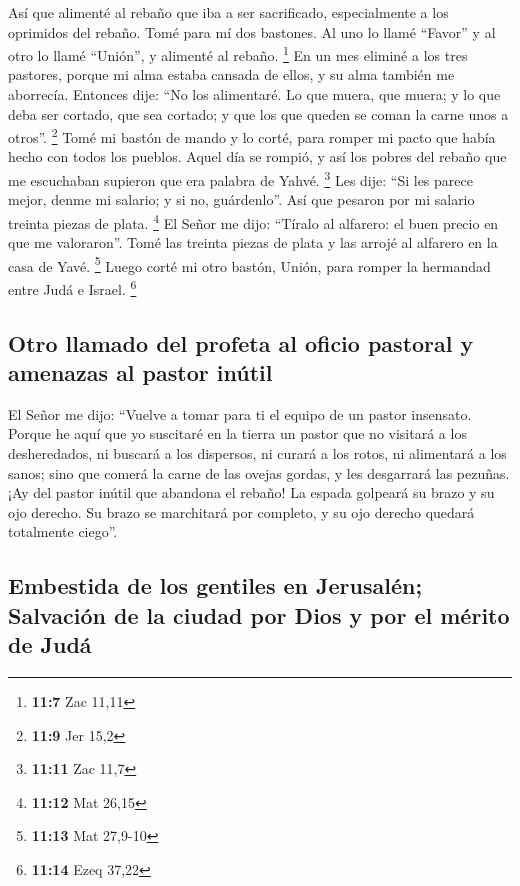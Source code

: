  Así que alimenté al rebaño que iba a ser sacrificado,
especialmente a los oprimidos del rebaño. Tomé para mí dos bastones. Al
uno lo llamé ``Favor'' y al otro lo llamé ``Unión'', y alimenté al
rebaño. \footnote{\textbf{11:7} Zac 11,11}  En un mes
eliminé a los tres pastores, porque mi alma estaba cansada de ellos, y
su alma también me aborrecía.  Entonces dije: ``No los
alimentaré. Lo que muera, que muera; y lo que deba ser cortado, que sea
cortado; y que los que queden se coman la carne unos a otros''.
\footnote{\textbf{11:9} Jer 15,2}  Tomé mi bastón de
mando y lo corté, para romper mi pacto que había hecho con todos los
pueblos.  Aquel día se rompió, y así los pobres del
rebaño que me escuchaban supieron que era palabra de Yahvé. \footnote{\textbf{11:11}
  Zac 11,7}  Les dije: ``Si les parece mejor, denme mi
salario; y si no, guárdenlo''. Así que pesaron por mi salario treinta
piezas de plata. \footnote{\textbf{11:12} Mat 26,15}  El
Señor me dijo: ``Tíralo al alfarero: el buen precio en que me
valoraron''. Tomé las treinta piezas de plata y las arrojé al alfarero
en la casa de Yavé. \footnote{\textbf{11:13} Mat 27,9-10}
 Luego corté mi otro bastón, Unión, para romper la
hermandad entre Judá e Israel. \footnote{\textbf{11:14} Ezeq 37,22}

\hypertarget{otro-llamado-del-profeta-al-oficio-pastoral-y-amenazas-al-pastor-inuxfatil}{%
\subsection{Otro llamado del profeta al oficio pastoral y amenazas al
pastor
inútil}\label{otro-llamado-del-profeta-al-oficio-pastoral-y-amenazas-al-pastor-inuxfatil}}

 El Señor me dijo: ``Vuelve a tomar para ti el equipo de
un pastor insensato.  Porque he aquí que yo suscitaré en
la tierra un pastor que no visitará a los desheredados, ni buscará a los
dispersos, ni curará a los rotos, ni alimentará a los sanos; sino que
comerá la carne de las ovejas gordas, y les desgarrará las pezuñas.
 ¡Ay del pastor inútil que abandona el rebaño! La espada
golpeará su brazo y su ojo derecho. Su brazo se marchitará por completo,
y su ojo derecho quedará totalmente ciego''.

\hypertarget{embestida-de-los-gentiles-en-jerusaluxe9n-salvaciuxf3n-de-la-ciudad-por-dios-y-por-el-muxe9rito-de-juduxe1}{%
\subsection{Embestida de los gentiles en Jerusalén; Salvación de la
ciudad por Dios y por el mérito de
Judá}\label{embestida-de-los-gentiles-en-jerusaluxe9n-salvaciuxf3n-de-la-ciudad-por-dios-y-por-el-muxe9rito-de-juduxe1}}


